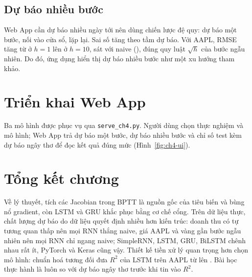 \subsection{Dự báo nhiều bước}
Web App cần dự báo nhiều ngày tới nên dùng chiến lược đệ quy: dự báo một bước, nối vào cửa sổ, lặp lại. Sai số tăng theo tầm dự báo. Với AAPL, RMSE tăng từ  ở $h=1$ lên  ở $h=10$, sát với naive (), đúng quy luật $\sqrt h$ của bước ngẫu nhiên.
Do đó, ứng dụng hiển thị dự báo nhiều bước như một xu hướng tham khảo.


\section{Triển khai Web App}\label{sec:rnn-deploy}
Ba mô hình được phục vụ qua \texttt{serve\_ch4.py}. Người dùng chọn thực nghiệm và mô hình; Web App trả dự báo một bước, dự báo nhiều bước và chỉ số test kèm dự báo ngây thơ để đọc kết quả đúng mức (Hình~\ref{fig:ch4-ui}).


\section{Tổng kết chương}
Về lý thuyết, tích các Jacobian trong BPTT là nguồn gốc của tiêu biến và bùng nổ gradient, còn LSTM và GRU khắc phục bằng cơ chế cổng. Trên dữ liệu thực, chất lượng dự báo do dữ liệu quyết định nhiều hơn kiến trúc: doanh thu có tự tương quan thấp nên mọi RNN thắng naive, giá AAPL và vàng gần bước ngẫu nhiên nên mọi RNN chỉ ngang naive; SimpleRNN, LSTM, GRU, BiLSTM chênh nhau rất ít, PyTorch và Keras cũng vậy.
Thiết kế tiền xử lý quan trọng hơn chọn mô hình: chuẩn hoá tương đối đưa $R^2$ của LSTM trên AAPL từ  lên . Bài học thực hành là luôn so với dự báo ngây thơ trước khi tin vào $R^2$.
